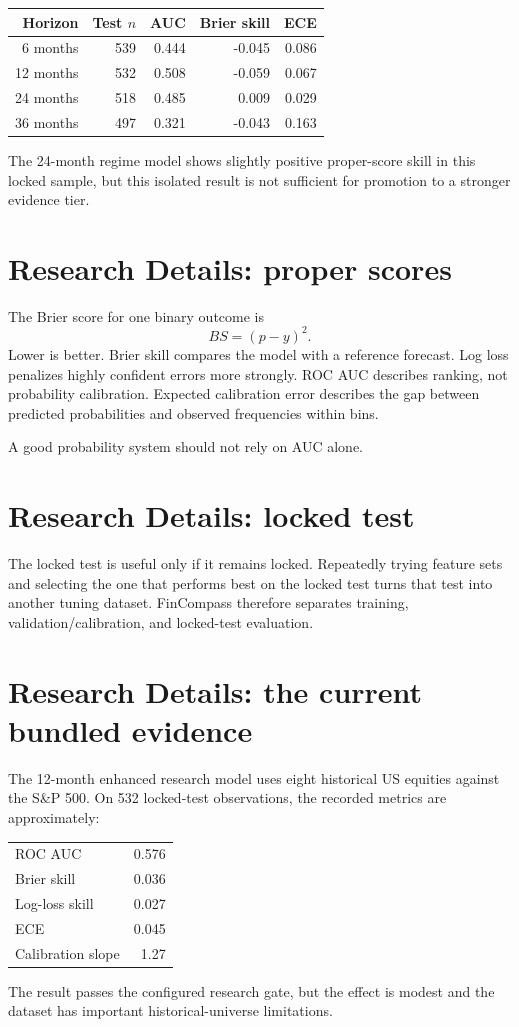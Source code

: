 \documentclass[11pt]{article}
\begin{document}
\begin{center}
\begin{tabular}{rrrrr}\toprule
Horizon & Test $n$ & AUC & Brier skill & ECE\\\midrule
6 months & 539 & 0.444 & -0.045 & 0.086\\
12 months & 532 & 0.508 & -0.059 & 0.067\\
24 months & 518 & 0.485 & 0.009 & 0.029\\
36 months & 497 & 0.321 & -0.043 & 0.163\\
\bottomrule\end{tabular}
\end{center}
The 24-month regime model shows slightly positive proper-score skill in this locked sample, but this isolated result is not sufficient for promotion to a stronger evidence tier.

\section{Research Details: proper scores}
The Brier score for one binary outcome is
\begin{equation}
BS=(p-y)^2.
\end{equation}
Lower is better. Brier skill compares the model with a reference forecast. Log loss penalizes highly confident errors more strongly. ROC AUC describes ranking, not probability calibration. Expected calibration error describes the gap between predicted probabilities and observed frequencies within bins.

A good probability system should not rely on AUC alone.

\section{Research Details: locked test}
The locked test is useful only if it remains locked. Repeatedly trying feature sets and selecting the one that performs best on the locked test turns that test into another tuning dataset. FinCompass therefore separates training, validation/calibration, and locked-test evaluation.

\section{Research Details: the current bundled evidence}
The 12-month enhanced research model uses eight historical US equities against the S\&P 500. On 532 locked-test observations, the recorded metrics are approximately:
\begin{center}
\begin{tabular}{lr}\toprule
ROC AUC & 0.576\\
Brier skill & 0.036\\
Log-loss skill & 0.027\\
ECE & 0.045\\
Calibration slope & 1.27\\
\bottomrule\end{tabular}
\end{center}
The result passes the configured research gate, but the effect is modest and the dataset has important historical-universe limitations.
\end{document}
